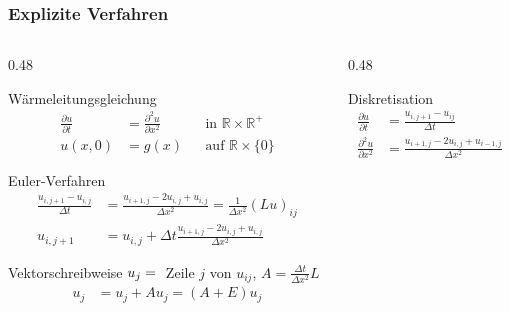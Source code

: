 %
%
%
\begin{frame}
\frametitle{Explizite Verfahren}
\vspace{-15pt}
\begin{columns}[t]
\begin{column}{0.48\hsize}
\begin{block}{Wärmeleitungsgleichung}
\vspace{-15pt}
\begin{align*}
\frac{\partial u}{\partial t}
&=
\frac{\partial^2 u}{\partial x^2}
&&\text{in $\mathbb R\times\mathbb R^+$}
\\
u(x,0)&=g(x)&&\text{auf $\mathbb R\times \{0\}$}
\end{align*}
\end{block}
\vspace{-10pt}
\begin{block}{Euler-Verfahren}
\vspace{-15pt}
\begin{align*}
\frac{u_{i,j+1}-u_{i,j}}{\Delta t}
&= 
\frac{u_{i+1,j}-2u_{i,j}+u_{i,j}}{\Delta x^2}
=
\frac{1}{\Delta x^2}(Lu)_{ij}
\\
u_{i,j+1}
&=
u_{i,j} + \Delta t
\frac{u_{i+1,j}-2u_{i,j}+u_{i,j}}{\Delta x^2}
\end{align*}
\end{block}
\vspace{-15pt}
\begin{block}{Vektorschreibweise}
$u_j=\mathstrut$ Zeile $j$ von $u_{ij}$, $A = \frac{\Delta t}{\Delta x^2}L$
\begin{align*}
u_j &=  u_j + Au_j = (A+E)u_j
\end{align*}
\end{block}
\end{column}
\begin{column}{0.48\hsize}
\begin{block}{Diskretisation}
\vspace{-15pt}
\begin{align*}
\frac{\partial u}{\partial t}
&=
\frac{u_{i,j+1}-u_{ij}}{\Delta t}
\\
\frac{\partial^2u}{\partial x^2}
&=
\frac{u_{i+1,j}-2u_{i,j}+u_{i-1,j}}{\Delta x^2}
\end{align*}
\begin{center}
\end{center}
\end{block}
\end{column}
\end{columns}
\end{frame}
